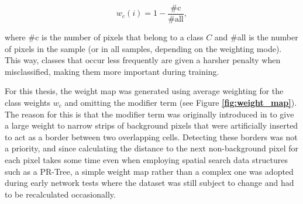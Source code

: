 \[ w_c(i) = 1 - \frac{\text{\#c}}{\text{\#all}}, \]

\noindent where \#c is the number of pixels that belong to a class $C$ and \#all is the number of pixels in the sample (or in all samples, depending on the weighting mode). This way, classes that occur less frequently are given a harsher penalty when misclassified, making them more important during training.

For this thesis, the weight map was generated using average weighting for the class weights $w_c$ and omitting the modifier term (see Figure \textbf{\ref{fig:weight_map}}). The reason for this is that the modifier term was originally introduced in \cite{unet} to give a large weight to narrow strips of background pixels that were artificially inserted to act as a border between two overlapping cells. Detecting these borders was not a priority, and since calculating the distance to the next non-background pixel for each pixel takes some time even when employing spatial search data structures such as a PR-Tree,  a simple weight map rather than a complex one was adopted during early network tests where the dataset was still subject to change and had to be recalculated occasionally.\\

